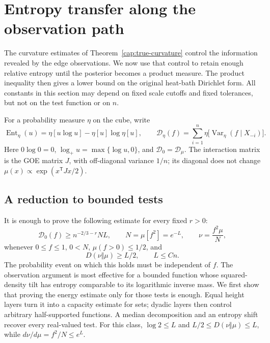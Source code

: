 \section{Entropy transfer along the observation path}\label{cap:entropy}

The curvature estimates of Theorem~\ref{cap:true-curvature} control the
information revealed by the edge observations. We now use that control to
retain enough relative entropy until the posterior becomes a product measure.
The product inequality then gives a lower bound on the original heat-bath
Dirichlet form. All constants in this section may depend on fixed scale
cutoffs and fixed tolerances, but not on the test function or on $n$.

For a probability measure $\eta$ on the cube, write
\[
 \operatorname{Ent}_{\eta}(u)
 =\eta[u\log u]-\eta[u]\log\eta[u],\qquad
 \mathcal D_{\eta}(f)=\sum_{i=1}^n
       \eta\big[\operatorname{Var}_{\eta}(f\mid X_{-i})\big].
\]
Here $0\log0=0$, $\log_+u=\max\{\log u,0\}$, and $\mathcal D_0=\mathcal
D_\mu$. The interaction matrix is the GOE matrix $J$, with off-diagonal
variance $1/n$; its diagonal does not change $\mu(x)\propto\exp(x^{\mathsf
T}Jx/2)$.

\subsection{A reduction to bounded tests}\label{cap:capacity-reduction}

It is enough to prove the following estimate for every fixed $r>0$:
\begin{equation}\label{cap:restricted-energy}
 \mathcal D_0(f)\ge n^{-2/3-r}N L,
 \qquad N=\mu[f^2]=e^{-L},\qquad
 \nu=\frac{f^2\mu}{N},
\end{equation}
whenever $0\le f\le1$, $0<N$, $\mu(f>0)\le1/2$, and
\begin{equation}\label{cap:restricted-entropy}
 D(\nu\Vert\mu)\ge L/2,\qquad L\le Cn.
\end{equation}
The probability event on which this holds must be independent of $f$. The
observation argument is most effective for a bounded function whose
squared-density tilt has entropy comparable to its logarithmic inverse mass.
We first show that proving the energy estimate only for those tests is enough.
Equal height layers turn it into a capacity estimate for sets; dyadic layers
then control arbitrary half-supported functions. A median decomposition and an
entropy shift recover every real-valued test.
For this class, $\log2\le L$ and
$L/2\le D(\nu\Vert\mu)\le L$, while $d\nu/d\mu=f^2/N\le e^L$.


